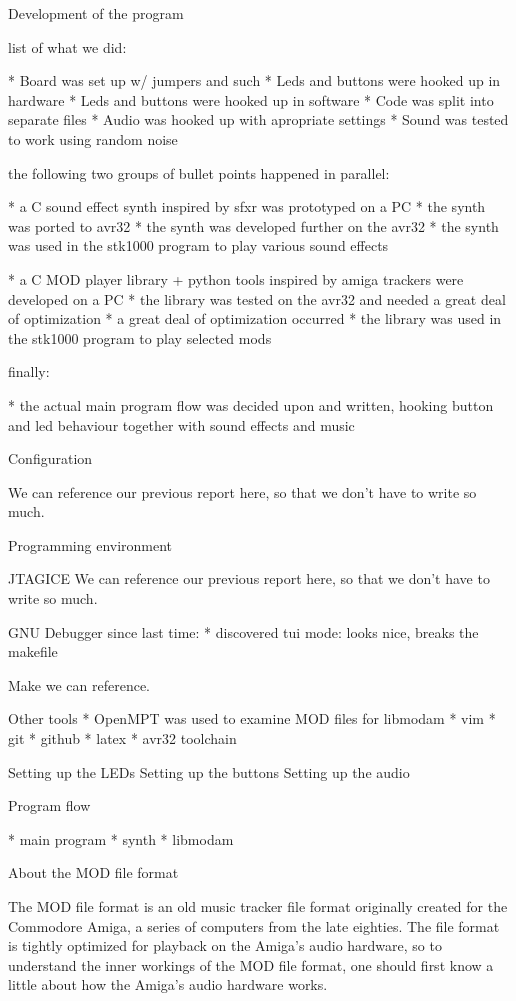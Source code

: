 Development of the program

list of what we did:

* Board was set up w/ jumpers and such
* Leds and buttons were hooked up in hardware
* Leds and buttons were hooked up in software
* Code was split into separate files
* Audio was hooked up with apropriate settings
* Sound was tested to work using random noise


the following two groups of bullet points happened in parallel:

* a C sound effect synth inspired by sfxr was prototyped on a PC
* the synth was ported to avr32
* the synth was developed further on the avr32
* the synth was used in the stk1000 program to play various sound effects

* a C MOD player library + python tools inspired by amiga trackers were developed on a PC
* the library was tested on the avr32 and needed a great deal of optimization
* a great deal of optimization occurred 
* the library was used in the stk1000 program to play selected mods


finally:

* the actual main program flow was decided upon and written, hooking button and led behaviour together with sound effects and music



Configuration

We can reference our previous report here, so that we don't have to write so much.


Programming environment

JTAGICE
We can reference our previous report here, so that we don't have to write so much.

GNU Debugger
since last time:
* discovered tui mode: looks nice, breaks the makefile

Make
we can reference.

Other tools
* OpenMPT was used to examine MOD files for libmodam
* vim
* git
* github
* latex
* avr32 toolchain

Setting up the LEDs
Setting up the buttons
Setting up the audio


Program flow

* main program
* synth
* libmodam



About the MOD file format

The MOD file format is an old music tracker file format originally created for the Commodore Amiga, a series of computers from the late eighties.
The file format is tightly optimized for playback on the Amiga's audio hardware, so to understand the inner workings of the MOD file format, one should first know a little about how the Amiga's audio hardware works.

